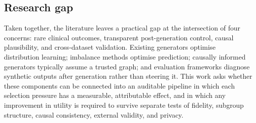 \subsection{Research gap}

Taken together, the literature leaves a practical gap at the intersection of four concerns: rare clinical outcomes, transparent post-generation control, causal plausibility, and cross-dataset validation. Existing generators optimise distribution learning; imbalance methods optimise prediction; causally informed generators typically assume a trusted graph; and evaluation frameworks diagnose synthetic outputs after generation rather than steering it. This work asks whether these components can be connected into an auditable pipeline in which each selection pressure has a measurable, attributable effect, and in which any improvement in \tstr{} utility is required to survive separate tests of fidelity, subgroup structure, causal consistency, external validity, and privacy.
